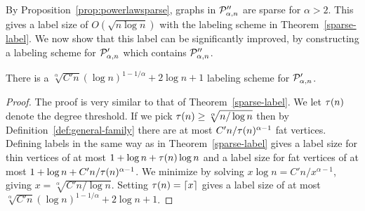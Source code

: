 
By Proposition~\ref{prop:powerlawsparse}, graphs in $ \mathcal{P}''_{\alpha,n}$ are sparse for $\alpha > 2$. This gives a label size of $O(\sqrt{n\log n})$ with the labeling scheme in Theorem~\ref{sparse-label}. We now show that this label can be significantly improved, by constructing a labeling scheme for $ \mathcal{P}'_{\alpha,n}$ which contains $ \mathcal{P}''_{\alpha,n}$.
\vspace{-0.1cm}
\begin{theorem}\label{prop:labelingMain}
 There is a $\sqrt[\alpha]{C'n}(\log n)^{1 - 1/\alpha} + 2\log n + 1$ labeling scheme for $ \mathcal{P}'_{\alpha,n}$.
\end{theorem}
\vspace{-0.3cm}
\begin{proof}
The proof is very similar to that of Theorem~\ref{sparse-label}. We let $\tau(n)$ denote the degree threshold. If we pick $\tau(n)\geq \sqrt[\alpha]{n/\log n}$ then by Definition~\ref{def:general-family}  there are at most $C'n / \tau(n)^{\alpha -1}$ fat vertices. Defining labels in the same way as in Theorem~\ref{sparse-label} gives a label size for thin vertices of at most $1 + \log n + \tau(n)\log n$ and a label size for fat vertices of at most
$1 + \log n + C'n / \tau(n)^{\alpha -1}$.
We minimize by solving
$x \log n = C'n / x^{\alpha -1}$, giving $x = \sqrt[\alpha]{C'n/\log n}$. Setting $\tau(n) = \lceil x\rceil$ gives a label size of at most $\sqrt[\alpha]{C'n}(\log n)^{1 - 1/\alpha} + 2\log n + 1$.
\end{proof}

